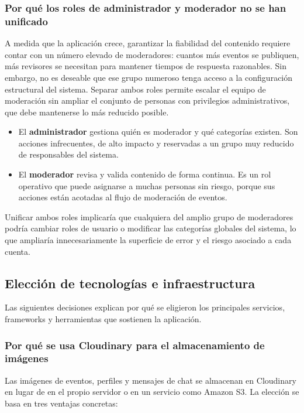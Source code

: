 \subsubsection{Por qué los roles de administrador y moderador no se han unificado}

A medida que la aplicación crece, garantizar la fiabilidad del contenido requiere contar con un número elevado de moderadores: cuantos más eventos se publiquen, más revisores se necesitan para mantener tiempos de respuesta razonables. Sin embargo, no es deseable que ese grupo numeroso tenga acceso a la configuración estructural del sistema. Separar ambos roles permite escalar el equipo de moderación sin ampliar el conjunto de personas con privilegios administrativos, que debe mantenerse lo más reducido posible.

\begin{itemize}
    \item El \textbf{administrador} gestiona quién es moderador y qué categorías existen. Son acciones infrecuentes, de alto impacto y reservadas a un grupo muy reducido de responsables del sistema.
    \item El \textbf{moderador} revisa y valida contenido de forma continua. Es un rol operativo que puede asignarse a muchas personas sin riesgo, porque sus acciones están acotadas al flujo de moderación de eventos.
\end{itemize}

Unificar ambos roles implicaría que cualquiera del amplio grupo de moderadores podría cambiar roles de usuario o modificar las categorías globales del sistema, lo que ampliaría innecesariamente la superficie de error y el riesgo asociado a cada cuenta.

\subsection{Elección de tecnologías e infraestructura}

Las siguientes decisiones explican por qué se eligieron los principales servicios, frameworks y herramientas que sostienen la aplicación.

\subsubsection{Por qué se usa Cloudinary para el almacenamiento de imágenes}

Las imágenes de eventos, perfiles y mensajes de chat se almacenan en Cloudinary en lugar de en el propio servidor o en un servicio como Amazon S3. La elección se basa en tres ventajas concretas:

